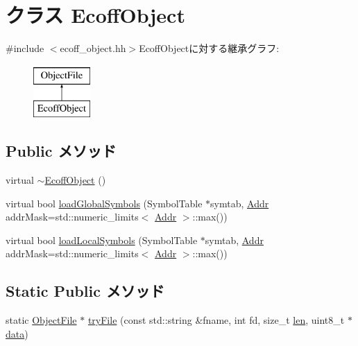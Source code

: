 \hypertarget{classEcoffObject}{
\section{クラス EcoffObject}
\label{classEcoffObject}
}


{\ttfamily \#include $<$ecoff\_\-object.hh$>$}EcoffObjectに対する継承グラフ:\begin{figure}[H]
\begin{center}
\leavevmode
\includegraphics[height=2cm]{classEcoffObject}
\end{center}
\end{figure}
\subsection*{Public メソッド}
\begin{DoxyCompactItemize}
\item 
virtual \hyperlink{classEcoffObject_a64f472690e786340ddbcc64b9a8e5597}{$\sim$EcoffObject} ()
\item 
virtual bool \hyperlink{classEcoffObject_a1de102f86bbb53d20455d9e78be53935}{loadGlobalSymbols} (SymbolTable $\ast$symtab, \hyperlink{base_2types_8hh_af1bb03d6a4ee096394a6749f0a169232}{Addr} addrMask=std::numeric\_\-limits$<$ \hyperlink{base_2types_8hh_af1bb03d6a4ee096394a6749f0a169232}{Addr} $>$::max())
\item 
virtual bool \hyperlink{classEcoffObject_aab9393b89c15838ac1b842e642f981bb}{loadLocalSymbols} (SymbolTable $\ast$symtab, \hyperlink{base_2types_8hh_af1bb03d6a4ee096394a6749f0a169232}{Addr} addrMask=std::numeric\_\-limits$<$ \hyperlink{base_2types_8hh_af1bb03d6a4ee096394a6749f0a169232}{Addr} $>$::max())
\end{DoxyCompactItemize}
\subsection*{Static Public メソッド}
\begin{DoxyCompactItemize}
\item 
static \hyperlink{classObjectFile}{ObjectFile} $\ast$ \hyperlink{classEcoffObject_af96c4ced69d653731f78ba9d9006e251}{tryFile} (const std::string \&fname, int fd, size\_\-t \hyperlink{classObjectFile_a7360b55975153b822efc5217b7734e6a}{len}, uint8\_\-t $\ast$\hyperlink{classObjectFile_abbae3bd152e2d64768026e03593e64f3}{data})
\end{DoxyCompactItemize}
